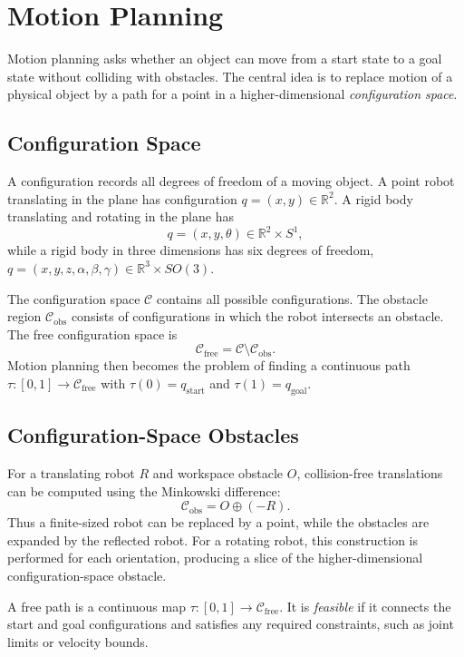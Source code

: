 \chapter{Motion Planning}
\label{ch:motion_planning}

Motion planning asks whether an object can move from a start state to a goal
state without colliding with obstacles. The central idea is to replace motion
of a physical object by a path for a point in a higher-dimensional
\emph{configuration space}.

\section{Configuration Space}
\label{sec:configuration_space}

A configuration records all degrees of freedom of a moving object. A point
robot translating in the plane has configuration $q=(x,y)\in\mathbb{R}^2$. A rigid
body translating and rotating in the plane has
\[
q=(x,y,\theta)\in\mathbb{R}^2\times S^1,
\]
while a rigid body in three dimensions has six degrees of freedom,
$q=(x,y,z,\alpha,\beta,\gamma)\in\mathbb{R}^3\times SO(3)$.

The configuration space $\mathcal{C}$ contains all possible configurations.
The obstacle region $\mathcal{C}_{\mathrm{obs}}$ consists of configurations
in which the robot intersects an obstacle. The free configuration space is
\[
\mathcal{C}_{\mathrm{free}} =
\mathcal{C}\setminus\mathcal{C}_{\mathrm{obs}}.
\]
Motion planning then becomes the problem of finding a continuous path
$\tau:[0,1]\to\mathcal{C}_{\mathrm{free}}$ with
$\tau(0)=q_{\mathrm{start}}$ and $\tau(1)=q_{\mathrm{goal}}$.

\section{Configuration-Space Obstacles}
\label{sec:configuration_obstacles}

For a translating robot $R$ and workspace obstacle $O$, collision-free
translations can be computed using the Minkowski difference:
\[
\mathcal{C}_{\mathrm{obs}} = O\oplus(-R).
\]
Thus a finite-sized robot can be replaced by a point, while the obstacles are
expanded by the reflected robot. For a rotating robot, this construction is
performed for each orientation, producing a slice of the higher-dimensional
configuration-space obstacle.

\begin{definition}
A free path is a continuous map $\tau:[0,1]\to\mathcal{C}_{\mathrm{free}}$.
It is \emph{feasible} if it connects the start and goal configurations and
satisfies any required constraints, such as joint limits or velocity bounds.
\end{definition}

